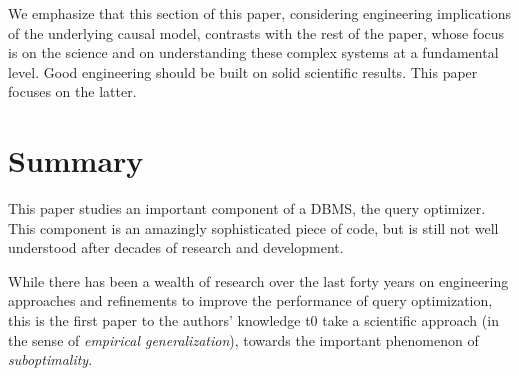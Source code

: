 \documentclass[prodmode,acmtods]{acmsmall}
\begin{document}
We emphasize that this section of this paper, considering engineering
implications of the underlying causal model, contrasts with the rest of the
paper, whose focus is on the science and on understanding these complex
systems at a fundamental level.  Good engineering should be built on solid
scientific results. This paper focuses on the latter.

\section{Summary}\label{sec:summary}

This paper studies an important
component of a \hbox{DBMS}, the query optimizer. This component is an amazingly
sophisticated piece of code, but is still not well understood after decades
of research and development.

While there has been a wealth of research over the last forty years on
engineering approaches and refinements to improve the performance of query
optimization, this is the first paper to the authors' knowledge t0 take a
scientific approach (in the sense of {\em empirical generalization}),
towards the important phenomenon of {\em suboptimality}.
\end{document}

